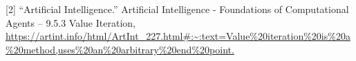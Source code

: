 \documentclass[11pt]{article}
\begin{document}
[2] “Artificial Intelligence.” Artificial Intelligence - Foundations of Computational Agents -- 9.5.3 Value Iteration, \url{https://artint.info/html/ArtInt_227.html#:~:text=Value\%20iteration\%20is\%20a\%20method,uses\%20an\%20arbitrary\%20end\%20point.}
{


}


\end{document}
